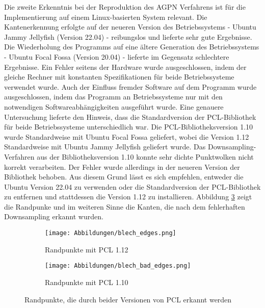 Die zweite Erkenntnis bei der Reproduktion des AGPN Verfahrens ist für die Implementierung auf einem Linux-basierten System relevant. Die Kantenerkennung erfolgte auf der neueren Version des Betriebssystems - Ubuntu Jammy Jellyfish (Version 22.04) - reibungslos und lieferte sehr gute Ergebnisse. Die Wiederholung des Programms auf eine ältere Generation des Betriebssystems - Ubuntu Focal Fossa (Version 20.04) - lieferte im Gegensatz schlechtere Ergebnisse. Ein Fehler seitens der Hardware wurde ausgeschlossen, indem der gleiche Rechner mit konstanten Spezifikationen für beide Betriebssysteme verwendet wurde. Auch der Einfluss fremder Software auf dem Programm wurde ausgeschlossen, indem das Programm an Betriebssysteme nur mit den notwendigen Softwareabhängigkeiten ausgeführt wurde. Eine genauere Untersuchung lieferte den Hinweis, dass die Standardversion der PCL-Bibliothek für beide Betriebssysteme unterschiedlich war. Die PCL-Bibliotheksversion 1.10 wurde Standardweise mit Ubuntu Focal Fossa geliefert, wobei die Version 1.12 Standardweise mit Ubuntu Jammy Jellyfish geliefert wurde. Das Downsampling-Verfahren aus der Bibliotheksversion 1.10 konnte sehr dichte Punktwolken nicht korrekt verarbeiten. Der Fehler wurde allerdings in der neueren Version der Bibliothek behoben. Aus diesem Grund lässt es sich empfehlen, entweder die Ubuntu Version 22.04 zu verwenden oder die Standardversion der PCL-Bibliothek zu entfernen und stattdessen die Version 1.12 zu installieren. Abbildung \ref{fig: pcl_version_comparision} zeigt die Randpunke und im weiteren Sinne die Kanten, die nach dem fehlerhaften Downsampling erkannt wurden.


\begin{figure}[t]
	\centering
	\begin{subfigure}[h]{0.49\textwidth}
		\texttt{[image: Abbildungen/blech\_edges.png]}
		\centering
		\caption{Randpunkte mit PCL 1.12}
		\label{fig: blech_edges}
	\end{subfigure}
	\hfill
	\begin{subfigure}[h]{0.49\textwidth}
		\texttt{[image: Abbildungen/blech\_bad\_edges.png]}
		\centering
		\caption{Randpunkte mit PCL 1.10}
		\label{fig: bad_edges}
	\end{subfigure}
	\caption{Randpunkte, die durch beider Versionen von PCL erkannt werden}
	\label{fig: pcl_version_comparision}
\end{figure}

